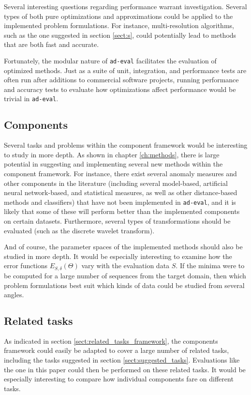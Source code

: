Several interesting questions regarding performance warrant investigation. Several types of both pure optimizations and approximations could be applied to the implemented problem formulations. For instance, multi-resolution algorithms, such as the one suggested in section \ref{sect:s}, could potentially lead to methods that are both fast and accurate.

Fortunately, the modular nature of \texttt{ad-eval} facilitates the evaluation of optimized methods. Just as a suite of unit, integration, and performance tests are often run after additions to commercial software projects, running performance and accuracy tests to evaluate how optimizations affect performance would be trivial in \texttt{ad-eval}.

\subsection{Components}

Several tasks and problems within the component framework would be interesting to study in more depth. As shown in chapter \ref{ch:methods}, there is large potential in suggesting and implementing several new methods within the component framework. For instance, there exist several anomaly measures and other components in the literature (including several model-based, artificial neural network-based, and statistical measures, as well as other distance-based methods and classifiers) that have not been implemented in \texttt{ad-eval}, and it is likely that some of these will perform better than the implemented components on certain datasets. Furthermore, several types of transformations should be evaluated (such as the discrete wavelet transform).

And of course, the parameter spaces of the implemented methods should also be studied in more depth. It would be especially interesting to examine how the error functions $E_{S, \delta}(\Theta)$ vary with the evaluation data $S$. If the minima were to be computed for a large number of sequences from the target domain, then which problem formulations best suit which kinds of data could be studied from several angles.

\subsection{Related tasks}

As indicated in section \ref{sect:related_tasks_framework}, the components framework could easily be adapted to cover a large number of related tasks, including the tasks suggested in section \ref{sect:suggested_tasks}. Evaluations like the one in this paper could then be performed on these related tasks. It would be especially interesting to compare how individual components fare on different tasks.

